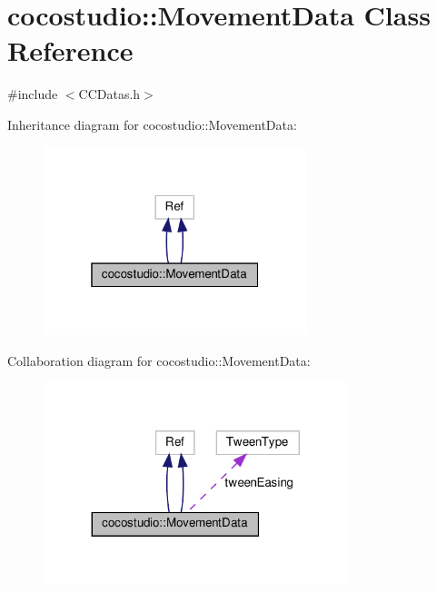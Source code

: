 \hypertarget{classcocostudio_1_1MovementData}{}\section{cocostudio\+:\+:Movement\+Data Class Reference}
\label{classcocostudio_1_1MovementData}


{\ttfamily \#include $<$C\+C\+Datas.\+h$>$}



Inheritance diagram for cocostudio\+:\+:Movement\+Data\+:
\nopagebreak
\begin{figure}[H]
\begin{center}
\leavevmode
\includegraphics[width=217pt]{classcocostudio_1_1MovementData__inherit__graph}
\end{center}
\end{figure}


Collaboration diagram for cocostudio\+:\+:Movement\+Data\+:
\nopagebreak
\begin{figure}[H]
\begin{center}
\leavevmode
\includegraphics[width=251pt]{classcocostudio_1_1MovementData__coll__graph}
\end{center}
\end{figure}
